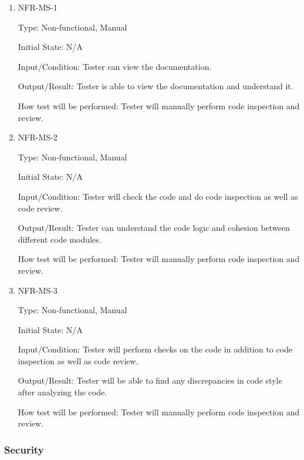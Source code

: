 \documentclass[12pt, titlepage]{article}
\begin{document}
\begin{enumerate}

\item{NFR-MS-1\\}

Type: Non-functional, Manual
					
Initial State: N/A
					
Input/Condition: Tester can view the documentation.
					
Output/Result: Tester is able to view the documentation and understand it.
					
How test will be performed: Tester will manually perform code inspection and review.

\item{NFR-MS-2\\}

Type: Non-functional, Manual
					
Initial State: N/A
					
Input/Condition: Tester will check the code and do code inspection as well as code review.
					
Output/Result: Tester can understand the code logic and cohesion between different code modules.
					
How test will be performed: Tester will manually perform code inspection and review.

\item{NFR-MS-3\\}

Type: Non-functional, Manual
					
Initial State: N/A
					
Input/Condition: Tester will perform checks on the code in addition to code inspection as well as code review.
					
Output/Result: Tester will be able to find any discrepancies in code style after analyzing the code.
					
How test will be performed: Tester will manually perform code inspection and review.

\end{enumerate}

\subsubsection{Security}
\end{document}
